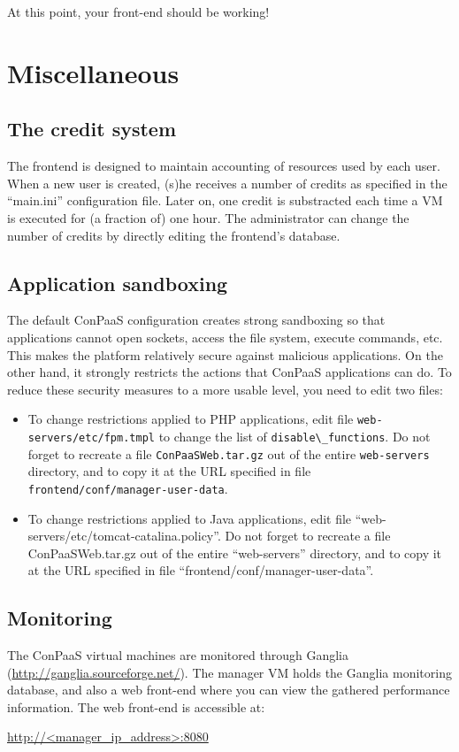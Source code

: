 \documentclass[10pt]{article}
\begin{document}
At this point, your front-end should be working!

\section{Miscellaneous}
\subsection{The credit system}

The frontend is designed to maintain accounting of resources used by
each user. When a new user is created, (s)he receives a number of
credits as specified in the ``main.ini'' configuration file. Later on,
one credit is substracted each time a VM is executed for (a fraction
of) one hour. The administrator can change the number of credits by
directly editing the frontend's database. 

\subsection{Application sandboxing}

The default ConPaaS configuration creates strong sandboxing so that
applications cannot open sockets, access the file system, execute
commands, etc. This makes the platform relatively secure against
malicious applications. On the other hand, it strongly restricts the
actions that ConPaaS applications can do. To reduce these security
measures to a more usable level, you need to edit two files:

\begin{itemize}
\item To change restrictions applied to PHP applications, edit file
  \verb+web-servers/etc/fpm.tmpl+ to change the list of
  \verb+disable\_functions+. Do not forget to recreate a file
  \verb+ConPaaSWeb.tar.gz+ out of the entire \verb+web-servers+
  directory, and to copy it at the URL specified in file
  \verb+frontend/conf/manager-user-data+.
\item To change restrictions applied to Java applications, edit file
  ``web-servers/etc/tomcat-catalina.policy''. Do not forget to
  recreate a file ConPaaSWeb.tar.gz out of the entire ``web-servers''
  directory, and to copy it at the URL specified in file
  ``frontend/conf/manager-user-data''.
\end{itemize}


\subsection{Monitoring}
The ConPaaS virtual machines are monitored through Ganglia 
(\url{http://ganglia.sourceforge.net/}). The manager VM holds
the Ganglia monitoring database, and also a web front-end
where you can view the gathered performance information. The
web front-end is accessible at:

\url{http://<manager_ip_address>:8080} 
\end{document}
